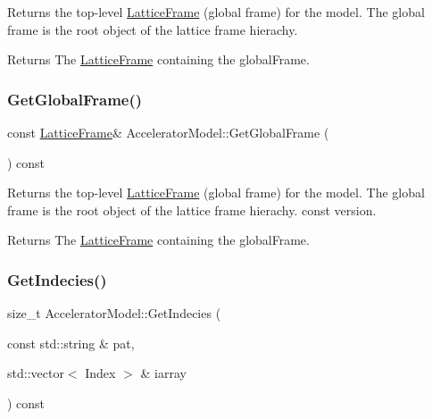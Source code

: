 Returns the top-\/level \hyperlink{classLatticeFrame}{Lattice\+Frame} (global frame) for the model. The global frame is the root object of the lattice frame hierachy. \begin{DoxyReturn}{Returns}
The \hyperlink{classLatticeFrame}{Lattice\+Frame} containing the global\+Frame. 
\end{DoxyReturn}
\mbox{\label{classAcceleratorModel_a4c3c860c99171aa3b386617d670ffd74}} 
\subsubsection{\texorpdfstring{Get\+Global\+Frame()}{GetGlobalFrame()}\hspace{0.1cm}{\footnotesize\ttfamily [2/2]}}
{\footnotesize\ttfamily const \hyperlink{classLatticeFrame}{Lattice\+Frame}\& Accelerator\+Model\+::\+Get\+Global\+Frame (\begin{DoxyParamCaption}{ }\end{DoxyParamCaption}) const\hspace{0.3cm}{\ttfamily [inline]}}

Returns the top-\/level \hyperlink{classLatticeFrame}{Lattice\+Frame} (global frame) for the model. The global frame is the root object of the lattice frame hierachy. const version. \begin{DoxyReturn}{Returns}
The \hyperlink{classLatticeFrame}{Lattice\+Frame} containing the global\+Frame. 
\end{DoxyReturn}
\mbox{\label{classAcceleratorModel_a90afd6c93e2f5b857c99dff1918b1b45}} 
\subsubsection{\texorpdfstring{Get\+Indecies()}{GetIndecies()}\hspace{0.1cm}{\footnotesize\ttfamily [1/2]}}
{\footnotesize\ttfamily size\+\_\+t Accelerator\+Model\+::\+Get\+Indecies (\begin{DoxyParamCaption}\item[{const std\+::string \&}]{pat,  }\item[{std\+::vector$<$ Index $>$ \&}]{iarray }\end{DoxyParamCaption}) const}

